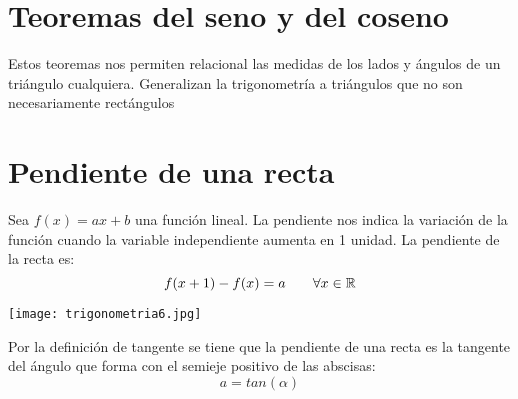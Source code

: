 \section{Teoremas del seno y del coseno}
Estos teoremas nos permiten relacional las medidas de los lados y ángulos de un triángulo cualquiera. Generalizan la trigonometría a triángulos que no son necesariamente rectángulos


\section{Pendiente de una recta}
Sea $f(x) = ax+b$ una función lineal. La pendiente nos indica la variación de la función cuando la variable independiente aumenta en 1 unidad. La pendiente de la recta es:
$$f(x+1) - f(x) = a \;\;\;\;\;\;\; \forall x \in {\mathbb{R}}$$
\begin{center}
    \texttt{[image: trigonometria6.jpg]}
\end{center}
Por la definición de tangente se tiene que la pendiente de una recta es la tangente del ángulo que forma con el semieje positivo de las abscisas:
$$\boxed{a = tan(\alpha)}$$
